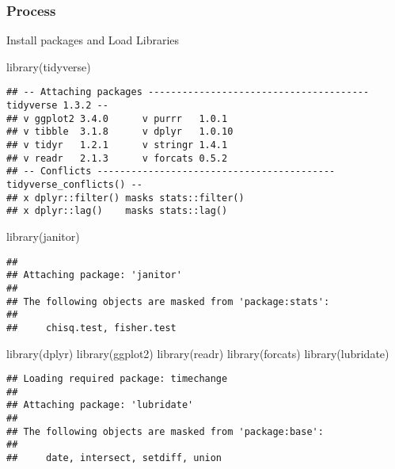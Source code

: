 \documentclass[
]{article}
\newenvironment{Shaded}{\begin{snugshade}}{\end{snugshade}}
\newcommand{\FunctionTok}[1]{\textcolor[rgb]{0.00,0.00,0.00}{#1}}
\newcommand{\NormalTok}[1]{#1}
\begin{document}
\hypertarget{process}{%
\subsubsection{Process}\label{process}}

Install packages and Load Libraries

\begin{Shaded}
\begin{Highlighting}[]
\FunctionTok{library}\NormalTok{(tidyverse)}
\end{Highlighting}
\end{Shaded}

\begin{verbatim}
## -- Attaching packages --------------------------------------- tidyverse 1.3.2 --
## v ggplot2 3.4.0      v purrr   1.0.1 
## v tibble  3.1.8      v dplyr   1.0.10
## v tidyr   1.2.1      v stringr 1.4.1 
## v readr   2.1.3      v forcats 0.5.2 
## -- Conflicts ------------------------------------------ tidyverse_conflicts() --
## x dplyr::filter() masks stats::filter()
## x dplyr::lag()    masks stats::lag()
\end{verbatim}

\begin{Shaded}
\begin{Highlighting}[]
\FunctionTok{library}\NormalTok{(janitor)}
\end{Highlighting}
\end{Shaded}

\begin{verbatim}
## 
## Attaching package: 'janitor'
## 
## The following objects are masked from 'package:stats':
## 
##     chisq.test, fisher.test
\end{verbatim}

\begin{Shaded}
\begin{Highlighting}[]
\FunctionTok{library}\NormalTok{(dplyr)}
\FunctionTok{library}\NormalTok{(ggplot2)}
\FunctionTok{library}\NormalTok{(readr)}
\FunctionTok{library}\NormalTok{(forcats)}
\FunctionTok{library}\NormalTok{(lubridate)}
\end{Highlighting}
\end{Shaded}

\begin{verbatim}
## Loading required package: timechange
## 
## Attaching package: 'lubridate'
## 
## The following objects are masked from 'package:base':
## 
##     date, intersect, setdiff, union
\end{verbatim}
\end{document}
